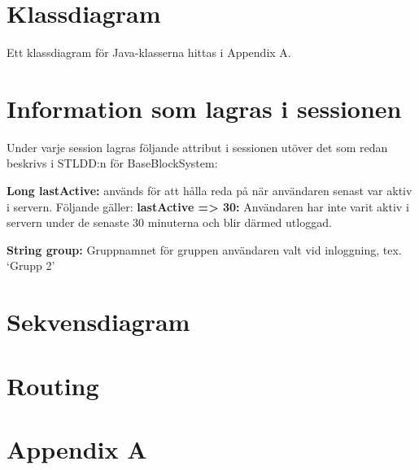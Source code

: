 \documentclass[paper=a4, fontsize=11pt,twoside]{article}
\begin{document}
\section{Klassdiagram}
Ett klassdiagram för Java-klasserna hittas i Appendix A.

\section{Information som lagras i sessionen}

Under varje session lagras följande attribut i sessionen utöver det som redan beskrivs i STLDD:n för BaseBlockSystem:

\textbf{Long lastActive:} 	används för att hålla reda på när användaren senast var aktiv i servern.
\newline
\newline
Följande gäller:
\newline
\textbf{lastActive => 30:}	Användaren har inte varit aktiv i servern under de senaste 30 minuterna och blir därmed utloggad.
	

\textbf{String group:} Gruppnamnet för gruppen användaren valt vid inloggning, tex. ‘Grupp 2’



\section{Sekvensdiagram}
\section{Routing}%

\section{Appendix A}
\end{document}
